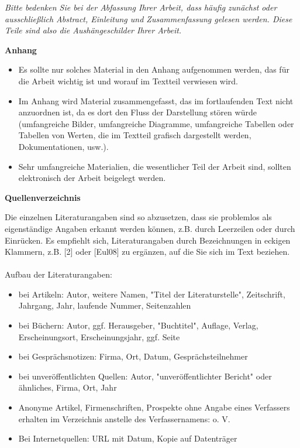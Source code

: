 \textit{Bitte bedenken Sie bei der Abfassung Ihrer Arbeit, dass häufig zunächst oder ausschließlich Abstract, Einleitung und Zusammenfassung gelesen werden. Diese Teile sind also die Aushängeschilder Ihrer Arbeit.}

\textbf{Anhang}
\begin{itemize}
\item Es sollte nur solches Material in den Anhang aufgenommen werden, das für die Arbeit wichtig ist und worauf im Textteil verwiesen wird.
\item Im Anhang wird Material zusammengefasst, das im fortlaufenden Text nicht anzuordnen ist, da es dort den Fluss der Darstellung stören würde (umfangreiche Bilder, umfangreiche Diagramme, umfangreiche Tabellen oder Tabellen von Werten, die im Textteil grafisch dargestellt werden, Dokumentationen, usw.).
\item Sehr umfangreiche Materialien, die wesentlicher Teil der Arbeit sind, sollten elektronisch der Arbeit beigelegt werden.

\end{itemize}


\textbf{Quellenverzeichnis}

Die einzelnen Literaturangaben sind so abzusetzen, dass sie problemlos als eigenständige Angaben erkannt werden können, z.B. durch Leerzeilen oder durch Einrücken. Es empfiehlt sich, Literaturangaben durch Bezeichnungen in eckigen Klammern, z.B. [2] oder [Eul08] zu ergänzen, auf die Sie sich im Text beziehen.\\ \\

Aufbau der Literaturangaben:
\begin{itemize}
\item bei Artikeln: Autor, weitere Namen, "Titel der Literaturstelle", Zeitschrift, Jahrgang, Jahr, laufende Nummer, Seitenzahlen
\item bei Büchern: Autor, ggf. Herausgeber, "Buchtitel", Auflage, Verlag, Erscheinungsort, Erscheinungsjahr, ggf. Seite
\item bei Gesprächsnotizen: Firma, Ort, Datum, Gesprächsteilnehmer
\item bei unveröffentlichten Quellen: Autor, "unveröffentlichter Bericht" oder ähnliches, Firma, Ort, Jahr
\item Anonyme Artikel, Firmenschriften, Prospekte ohne Angabe eines Verfassers erhalten im Verzeichnis anstelle des Verfassernamens: o. V. 
\item Bei Internetquellen: URL mit Datum, Kopie auf Datenträger 
\end{itemize}

